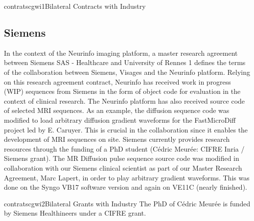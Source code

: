 \documentclass{ra2018}
\begin{document}
\begin{module}{contrats}{cgwi1}{Bilateral Contracts with Industry}

\subsection{Siemens}
In the context of the Neurinfo imaging platform, a master research agreement between Siemens SAS - Healthcare and University of Rennes 1 defines the terms of the collaboration between Siemens, Visages and the Neurinfo platform. Relying on
this research agreement contract, Neurinfo has received work in progress (WIP) sequences from Siemens in the form of object code for evaluation in the context of clinical research. The Neurinfo platform has also received source code of selected MRI sequences. As an example, the diffusion sequence code was modified to load arbitrary diffusion gradient waveforms for the FastMicroDiff project led by E. Caruyer. This is crucial in the collaboration since it enables the development of MRI sequences on site. Siemens currently provides research resources through the funding of a PhD student (Cédric Meurée: CIFRE Inria / Siemens grant). The MR Diffusion pulse sequence source code was modified in collaboration with our Siemens clinical scientist as part of our Master Research Agreement, Marc Lapert, in order to play arbitrary gradient waveforms. This was done on the Syngo VB17 software version and again on VE11C (nearly finished).

\end{module}

\begin{module}{contrats}{cgwi2}{Bilateral Grants with Industry}
The PhD of Cédric Meurée is funded by Siemens Healthineers under a CIFRE grant. 
\end{module}
\end{document}
